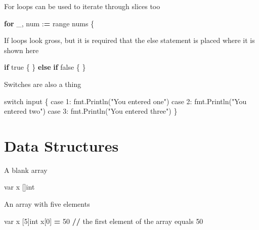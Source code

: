 \documentclass[]{book}
\newenvironment{Shaded}{\begin{snugshade}}{\end{snugshade}}
\newcommand{\BuiltInTok}[1]{#1}
\newcommand{\ControlFlowTok}[1]{\textcolor[rgb]{0.13,0.29,0.53}{\textbf{#1}}}
\newcommand{\DecValTok}[1]{\textcolor[rgb]{0.00,0.00,0.81}{#1}}
\newcommand{\NormalTok}[1]{#1}
\newcommand{\OperatorTok}[1]{\textcolor[rgb]{0.81,0.36,0.00}{\textbf{#1}}}
\newcommand{\StringTok}[1]{\textcolor[rgb]{0.31,0.60,0.02}{#1}}
\begin{document}
For loops can be used to iterate through slices too

\begin{Shaded}
\begin{Highlighting}[]
\ControlFlowTok{for}\NormalTok{ _, num :}\OperatorTok{=} \BuiltInTok{range}\NormalTok{ nums \{}
\end{Highlighting}
\end{Shaded}

If loops look gross, but it is required that the else statement is placed where it is shown here

\begin{Shaded}
\begin{Highlighting}[]
\ControlFlowTok{if}\NormalTok{ true \{}
\NormalTok{\} }\ControlFlowTok{else} \ControlFlowTok{if}\NormalTok{ false \{}
\NormalTok{\}}
\end{Highlighting}
\end{Shaded}

Switches are also a thing

\begin{Shaded}
\begin{Highlighting}[]
\NormalTok{switch }\BuiltInTok{input}\NormalTok{ \{                          }
\NormalTok{    case }\DecValTok{1}\NormalTok{: fmt.Println(}\StringTok{"You entered one"}\NormalTok{)  }
\NormalTok{    case }\DecValTok{2}\NormalTok{: fmt.Println(}\StringTok{"You entered two"}\NormalTok{)  }
\NormalTok{    case }\DecValTok{3}\NormalTok{: fmt.Println(}\StringTok{"You entered three"}\NormalTok{)}
\NormalTok{\}                                           }
\end{Highlighting}
\end{Shaded}

\hypertarget{data-structures}{%
\section{Data Structures}\label{data-structures}}

A blank array

\begin{Shaded}
\begin{Highlighting}[]
\NormalTok{var x []}\BuiltInTok{int}
\end{Highlighting}
\end{Shaded}

An array with five elements

\begin{Shaded}
\begin{Highlighting}[]
\NormalTok{var x [}\DecValTok{5}\NormalTok{]}\BuiltInTok{int}
\NormalTok{x[}\DecValTok{0}\NormalTok{] }\OperatorTok{=} \DecValTok{50} \OperatorTok{//}\NormalTok{ the first element of the array equals }\DecValTok{50}
\end{Highlighting}
\end{Shaded}
\end{document}
